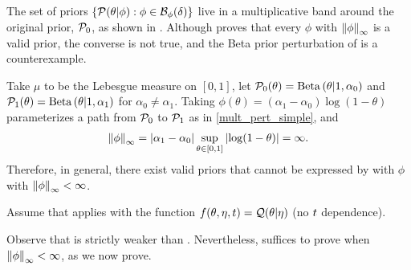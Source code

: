 The set of priors $\left\{\mathcal{P}(\theta \vert \phi) : \phi \in
\mathcal{B}_\phi(\delta)\right\}$ live in a multiplicative band around the original
prior, $\mathcal{P}_{0}$, as shown in . Although
 proves that every $\phi$ with $\left\Vert\phi\right\Vert_{\infty}$ is a
valid prior, the converse is not true, and the Beta prior perturbation of
 is a counterexample.

\FunctionBallFig{}


\begin{ex}
%
Take $\mu$ to be the Lebesgue measure on $[0,1]$, let $\mathcal{P}_{0}(\theta) =
\mathrm{Beta}\left(\theta \vert 1, \alpha_0\right)$ and $\mathcal{P}_{1}(\theta) = \mathrm{Beta}\left(\theta \vert
1, \alpha_1\right)$ for $\alpha_0 \ne \alpha_1$.  Taking
$\phi(\theta) = (\alpha_1 - \alpha_0) \log(1 - \theta)$ parameterizes
a path from $\mathcal{P}_{0}$ to $\mathcal{P}_{1}$ as in \eqref{mult_pert_simple}, and
%
\begin{align*}
%
\norminf{\phi} =
    \abs{\alpha_1 - \alpha_0} \sup_{\theta \in [0,1]} \abs{\log(1 - \theta)} =
    \infty.
%
\end{align*}
%
Therefore, in general, there exist valid priors that cannot be expressed by
 with $\phi$ with $\left\Vert\phi\right\Vert_{\infty} < \infty$.
%
\end{ex}


\begin{assu}
%
Assume that  applies with the function $f(\theta, \eta,
t) = \mathcal{Q}(\theta \vert \eta)$ (no $t$ dependence).
%
\end{assu}

Observe that  is strictly weaker than
.  Nevertheless, 
suffices to prove  when $\left\Vert\phi\right\Vert_{\infty} < \infty$,
as we now prove.


